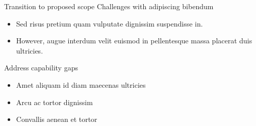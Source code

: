 \begin{frame}{Transition to proposed scope}
    Challenges with adipiscing bibendum
    \begin{itemize}
        \item Sed risus pretium quam vulputate dignissim suspendisse in.
        \item However, augue interdum velit euismod in pellentesque massa placerat duis ultricies.
    \end{itemize}
    \bigskip
    Address capability gaps
    \begin{itemize}
        \item Amet aliquam id diam maecenas ultricies
        \item Arcu ac tortor dignissim 
        \item Convallis aenean et tortor
    \end{itemize}
\end{frame}
